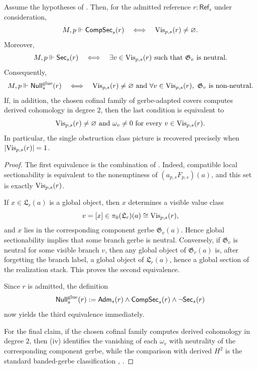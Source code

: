 \begin{theorem}\label{thm:gerbe-null-semantics}
Assume the hypotheses of . Then, for the admitted reference $r:\mathsf{Ref}_s$ under consideration,
\[
M,p\Vdash \mathsf{CompSec}_s(r)
\quad\Longleftrightarrow\quad
\mathrm{Vis}_{p,s}(r)\neq\varnothing.
\]
Moreover,
\[
M,p\Vdash \mathsf{Sec}_s(r)
\quad\Longleftrightarrow\quad
\exists v\in \mathrm{Vis}_{p,s}(r)\ \text{such that}\ \mathfrak G_v\ \text{is neutral}.
\]
Consequently,
\[
M,p\Vdash \mathsf{Null}^{\mathrm{glue}}_s(r)
\quad\Longleftrightarrow\quad
\mathrm{Vis}_{p,s}(r)\neq\varnothing
\ \text{and}\
\forall v\in \mathrm{Vis}_{p,s}(r),\ \mathfrak G_v\ \text{is non-neutral}.
\]
If, in addition, the chosen cofinal family of gerbe-adapted covers computes derived cohomology in degree $2$, then the last condition is equivalent to
\[
\mathrm{Vis}_{p,s}(r)\neq\varnothing
\ \text{and}\
\omega_v\neq 0\ \text{for every}\ v\in \mathrm{Vis}_{p,s}(r).
\]
In particular, the single obstruction class picture is recovered precisely when $|\mathrm{Vis}_{p,s}(r)|=1$.
\end{theorem}

\begin{proof}
The first equivalence is the combination of . Indeed, compatible local sectionability is equivalent to the nonemptiness of $(a_{p,s}F_{p,s})(a)$, and this set is exactly $\mathrm{Vis}_{p,s}(r)$.

If $x\in \mathfrak L_r(a)$ is a global object, then $x$ determines a visible value class
\[
v=[x]\in \pi_0(\mathfrak L_r)(a)\cong \mathrm{Vis}_{p,s}(r),
\]
and $x$ lies in the corresponding component gerbe $\mathfrak G_v(a)$. Hence global sectionability implies that some branch gerbe is neutral. Conversely, if $\mathfrak G_v$ is neutral for some visible branch $v$, then any global object of $\mathfrak G_v(a)$ is, after forgetting the branch label, a global object of $\mathfrak L_r(a)$, hence a global section of the realization stack. This proves the second equivalence.

Since $r$ is admitted, the definition
\[
\mathsf{Null}^{\mathrm{glue}}_s(r):=\mathsf{Adm}_s(r)\land \mathsf{CompSec}_s(r)\land \neg\mathsf{Sec}_s(r)
\]
now yields the third equivalence immediately.

For the final claim, if the chosen cofinal family computes derived cohomology in degree $2$, then (iv) identifies the vanishing of each $\omega_v$ with neutrality of the corresponding component gerbe, while the comparison with derived $H^2$ is the standard banded-gerbe classification \cite[Chap.~IV]{Giraud1971}, \cite[Tag 06NY]{StacksProject}.
\end{proof}

